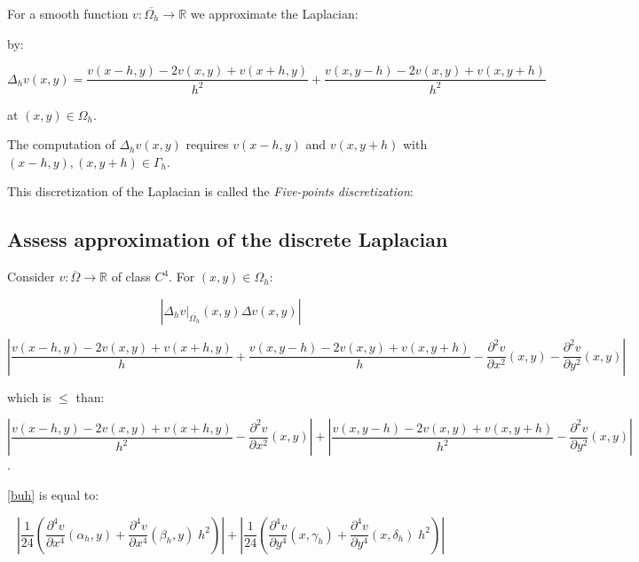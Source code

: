 For a smooth function $v: \overline{\Omega_h} \rightarrow \mathbb{R}$ we approximate the Laplacian:


by:

\begin{equation}
\Delta_h v(x, y) = \frac{v(x-h, y) - 2v(x,y) + v(x+h, y)}{h^2} + \frac{v(x, y-h) - 2v(x,y) + v(x, y+h)}{h^2}
\end{equation}

at $(x, y) \in \Omega_h$.


The computation of $\Delta_h v(x, y)$ requires $v(x-h, y)$ and $v(x, y+h)$ with $(x-h, y), (x, y+h) \in \Gamma_h$.

This discretization of the Laplacian is called the \textit{Five-points discretization}:



\subsection{Assess approximation of the discrete Laplacian}

Consider $v: \overline{\Omega} \rightarrow \mathbb{R}$ of class $C^4$. For $(x, y) \in \Omega_h$:

\begin{equation}
|\Delta_h v {|}_{\overline{\Omega_h}} (x,y) \Delta v(x,y)|
\end{equation}

\begin{equation}
|\frac{v(x-h, y)  - 2v(x, y) + v(x+h, y)}{h} + \frac{v(x, y-h) - 2v(x, y) + v(x, y+h)}{h} - \frac{\partial^2 v}{\partial x^2}(x, y) - \frac{\partial^2 v}{\partial y^2}(x, y)|
\end{equation}

which is $\leq$ than: 

\begin{equation}
|\frac{v(x-h, y) - 2v(x, y) + v(x+h, y)}{h^2} - \frac{\partial^2 v}{\partial x^2}(x, y)| + |\frac{v(x, y-h) - 2v(x, y) + v(x, y+h)}{h^2} - \frac{\partial^2 v}{\partial y^2}(x, y)|
\label{buh}
\end{equation}
.

\ref{buh} is equal to:

\begin{equation}
|\frac{1}{24} ( \frac{\partial^4 v}{\partial x^4}(\alpha_h, y) + \frac{\partial^4 v}{\partial x^4}(\beta_h, y) \; h^2) | + |\frac{1}{24} ( \frac{\partial^4 v}{\partial y^4}(x, \gamma_h) + \frac{\partial^4 v}{\partial y^4}(x, \delta_h) \; h^2) |
\label{buh2}
\end{equation}

